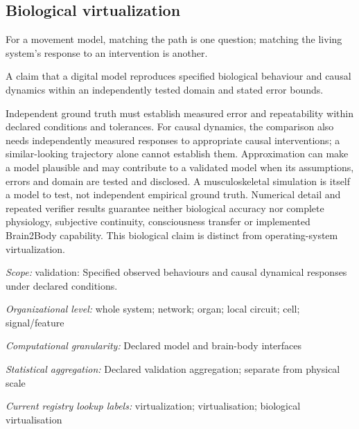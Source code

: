 \begin{samepage}
\subsection*{Biological virtualization}
\noindent For a movement model, matching the path is one question; matching the living system’s response to an intervention is another.\par
\end{samepage}
\noindent A claim that a digital model reproduces specified biological behaviour and causal dynamics within an independently tested domain and stated error bounds.\par
\noindent Independent ground truth must establish measured error and repeatability within declared conditions and tolerances. For causal dynamics, the comparison also needs independently measured responses to appropriate causal interventions; a similar-looking trajectory alone cannot establish them. Approximation can make a model plausible and may contribute to a validated model when its assumptions, errors and domain are tested and disclosed. A musculoskeletal simulation is itself a model to test, not independent empirical ground truth. Numerical detail and repeated verifier results guarantee neither biological accuracy nor complete physiology, subjective continuity, consciousness transfer or implemented Brain2Body capability. This biological claim is distinct from operating-system virtualization.\par
\noindent\textit{Scope:} validation: Specified observed behaviours and causal dynamical responses under declared conditions.\par
\noindent\textit{Organizational level:} whole system; network; organ; local circuit; cell; signal/feature\par
\noindent\textit{Computational granularity:} Declared model and brain-body interfaces\par
\begin{samepage}
\noindent\textit{Statistical aggregation:} Declared validation aggregation; separate from physical scale\par\nopagebreak[4]

\end{samepage}


\noindent\textit{Current registry lookup labels:} virtualization; virtualisation; biological virtualisation\par

